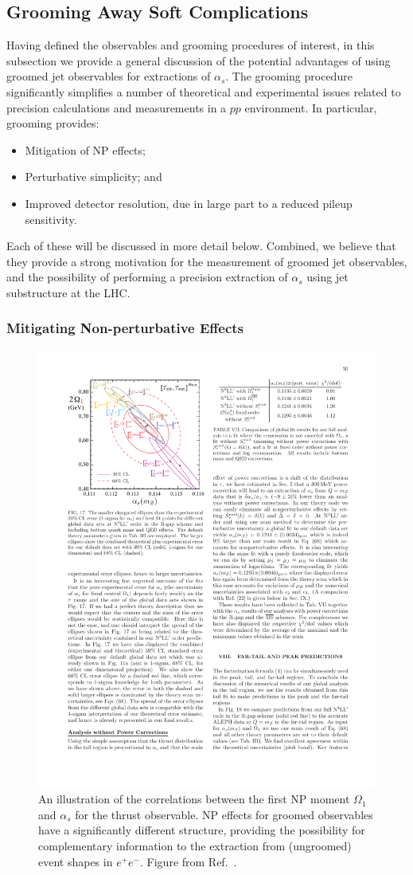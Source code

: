 \documentclass[11pt]{cernrep}
\begin{document}
\subsection{Grooming Away Soft Complications}
\label{jetsub_alphas_sec:softcomplications}

Having defined the observables and grooming procedures of interest, in this subsection we provide a general discussion of the potential advantages of using groomed jet observables for extractions of $\alpha_s$.
%
The grooming procedure significantly simplifies a number of theoretical and experimental issues related to precision calculations and measurements in a $pp$ environment.
%
In particular, grooming provides:
%
\begin{itemize}
\item Mitigation of NP effects;
\item Perturbative simplicity; and
\item Improved detector resolution, due in large part to a reduced pileup sensitivity.
\end{itemize}
%
Each of these will be discussed in more detail below.
%
Combined, we believe that they provide a strong motivation for the measurement of  groomed jet observables, and the possibility of performing a precision extraction of $\alpha_s$ using jet substructure at the LHC.

\subsubsection{Mitigating Non-perturbative Effects}

\begin{figure}[t]
\begin{center}
\includegraphics[width = 0.5\columnwidth]{jetsub_alphas_correlation_firstmoment.pdf}
\end{center}
\caption{An illustration of the correlations between the first NP moment $\Omega_1$ and $\alpha_s$ for the thrust observable.
%
NP effects for groomed observables have a significantly different structure, providing the possibility for complementary information to the extraction from (ungroomed) event shapes in $e^+e^-$.
%
Figure from Ref.~\cite{Abbate:2010xh}.}
\label{jetsub_alphas_fig:correlation_firstmoment}
\end{figure}
\end{document}
